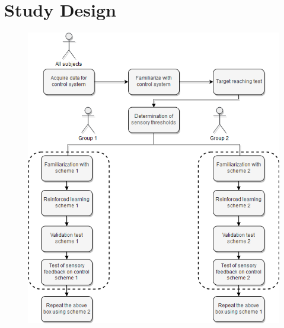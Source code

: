 \section{Study Design}

\begin{figure}[H]                 
	\includegraphics[width=.57\textwidth]{figures/std_design}  
	\caption{}
	\label{fig:std} 
\end{figure}